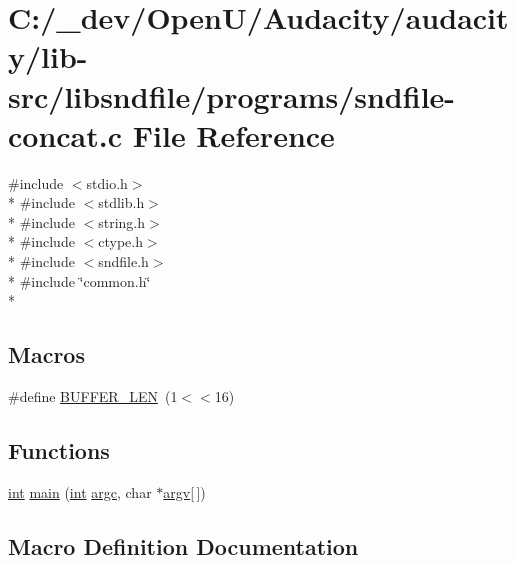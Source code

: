 \hypertarget{sndfile-concat_8c}{}\section{C\+:/\+\_\+dev/\+Open\+U/\+Audacity/audacity/lib-\/src/libsndfile/programs/sndfile-\/concat.c File Reference}
\label{sndfile-concat_8c}
{\ttfamily \#include $<$stdio.\+h$>$}\\*
{\ttfamily \#include $<$stdlib.\+h$>$}\\*
{\ttfamily \#include $<$string.\+h$>$}\\*
{\ttfamily \#include $<$ctype.\+h$>$}\\*
{\ttfamily \#include $<$sndfile.\+h$>$}\\*
{\ttfamily \#include \char`\"{}common.\+h\char`\"{}}\\*
\subsection*{Macros}
\begin{DoxyCompactItemize}
\item 
\#define \hyperlink{sndfile-concat_8c_a46130dc86f2322714bba26960b64e7bb}{B\+U\+F\+F\+E\+R\+\_\+\+L\+EN}~(1$<$$<$16)
\end{DoxyCompactItemize}
\subsection*{Functions}
\begin{DoxyCompactItemize}
\item 
\hyperlink{xmltok_8h_a5a0d4a5641ce434f1d23533f2b2e6653}{int} \hyperlink{sndfile-concat_8c_a0ddf1224851353fc92bfbff6f499fa97}{main} (\hyperlink{xmltok_8h_a5a0d4a5641ce434f1d23533f2b2e6653}{int} \hyperlink{cmdline_8c_aaffeb1bf2056ea44af5b5d0ee4d6ff07}{argc}, char $\ast$\hyperlink{cmdline_8c_ad407d5ba91709bd9b092003858600723}{argv}\mbox{[}$\,$\mbox{]})
\end{DoxyCompactItemize}


\subsection{Macro Definition Documentation}
